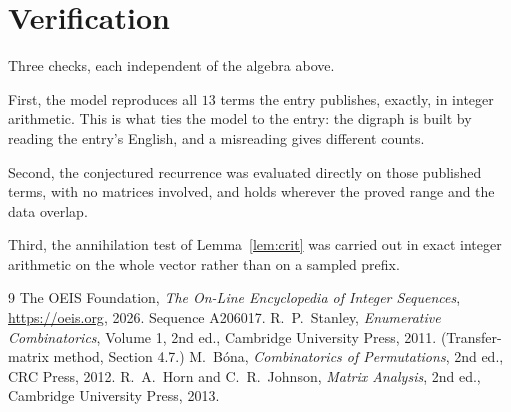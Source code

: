 \documentclass[11pt,a4paper]{article}
\theoremstyle{plain}
\theoremstyle{definition}
\begin{document}
\section{Verification}

Three checks, each independent of the algebra above.

First, the model reproduces all $13$ terms the entry publishes, exactly, in integer
arithmetic. This is what ties the model to the entry: the digraph is built by reading the
entry's English, and a misreading gives different counts.

Second, the conjectured recurrence was evaluated directly on those published terms, with no
matrices involved, and holds wherever the proved range and the data overlap.

Third, the annihilation test of Lemma~\ref{lem:crit} was carried out in exact integer
arithmetic on the whole vector rather than on a sampled prefix.

\begin{thebibliography}{9}
 The OEIS Foundation, \emph{The On-Line Encyclopedia of Integer
Sequences}, \url{https://oeis.org}, 2026. Sequence A206017.
 R.~P.~Stanley, \emph{Enumerative Combinatorics}, Volume 1, 2nd ed.,
Cambridge University Press, 2011. (Transfer-matrix method, Section 4.7.)
 M.~B\'ona, \emph{Combinatorics of Permutations}, 2nd ed., CRC
Press, 2012.
 R.~A.~Horn and C.~R.~Johnson, \emph{Matrix Analysis}, 2nd ed., Cambridge
University Press, 2013.
\end{thebibliography}
\end{document}
